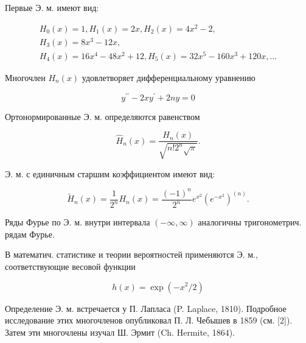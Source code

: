 \documentclass[10pt]{article}
\begin{document}
Первые Э. м. имеют вид:



\[

\begin{gathered}

H_{0}(x)=1, H_{1}(x)=2 x, H_{2}(x)=4 x^{2}-2, \\

H_{3}(x)=8 x^{3}-12 x, \\

H_{4}(x)=16 x^{4}-48 x^{2}+12, H_{5}(x)=32 x^{5}-160 x^{3}+120 x, \ldots

\end{gathered}

\]



Многочлен $H_{n}(x)$ удовлетворяет дифференциальному уравнению



\[

y^{\prime \prime}-2 x y^{\prime}+2 n y=0

\]



Ортонормированные Э. м. определяются равенством



\[

\hat{H}_{n}(x)=\frac{H_{n}(x)}{\sqrt{n ! 2^{n} \sqrt{\pi}}} .

\]



Э. м. с единичным старшим коэффициентом имеют вид:



\[

\tilde{H}_{n}(x)=\frac{1}{2^{n}} H_{n}(x)=\frac{(-1)^{n}}{2^{n}} e^{x^{2}}\left(e^{-x^{2}}\right)^{(n)} .

\]



Ряды Фурье по Э. м. внутри интервала $(-\infty, \infty)$ аналогичны тригонометрич. рядам Фурье.



В математич. статистике и теории вероятностей применяются Э. м., соответствующие весовой функции



\[

h(x)=\exp \left(-x^{2} / 2\right)

\]



Определение Э. м. встречается у П. Лапласа (P. Laplace, 1810). Подробное исследование этих многочленов опубликовал П. Л. Чебышев в 1859 (см. [2]). Затем эти многочлены изучал Ш. Эрмит (Ch. Hermite, 1864).
\end{document}
